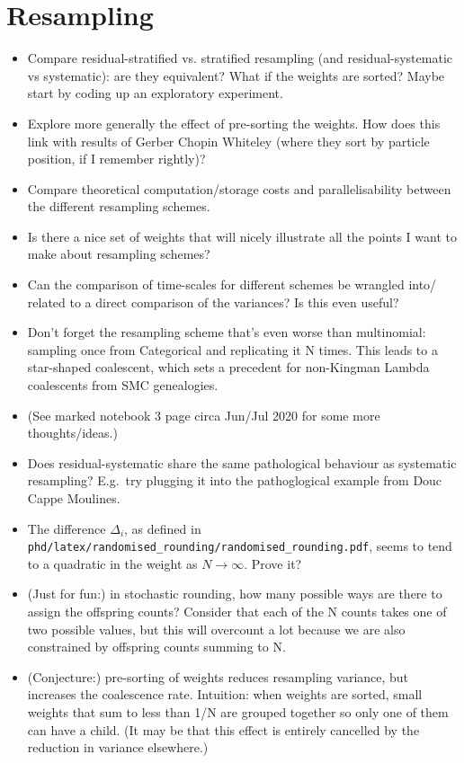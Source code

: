 \documentclass{article}
\begin{document}
\section*{Resampling}
\begin{itemize}
\item Compare residual-stratified vs. stratified resampling (and residual-systematic vs systematic): are they equivalent? What if the weights are sorted? Maybe start by coding up an exploratory experiment.
\item Explore more generally the effect of pre-sorting the weights. How does this link with results of Gerber Chopin Whiteley (where they sort by particle position, if I remember rightly)?
\item Compare theoretical computation/storage costs and parallelisability between the different resampling schemes.
\item Is there a nice set of weights that will nicely illustrate all the points I want to make about resampling schemes?
\item Can the comparison of time-scales for different schemes be wrangled into/ related to a direct comparison of the variances? Is this even useful?
\item Don't forget the resampling scheme that's even worse than multinomial: sampling once from Categorical and replicating it N times. This leads to a star-shaped coalescent, which sets a precedent for non-Kingman Lambda coalescents from SMC genealogies.
\item (See marked notebook 3 page circa Jun/Jul 2020 for some more thoughts/ideas.)
\item Does residual-systematic share the same pathological behaviour as systematic resampling? E.g.\ try plugging it into the pathoglogical example from Douc Cappe Moulines.
\item The difference $\Delta_i$, as defined in \texttt{phd/latex/randomised\_rounding/randomised\_rounding.pdf}, seems to tend to a quadratic in the weight as $N\to\infty$. Prove it?
\item (Just for fun:) in stochastic rounding, how many possible ways are there to assign the offspring counts? Consider that each of the N counts takes one of two possible values, but this will overcount a lot because we are also constrained by offspring counts summing to N.
\item (Conjecture:) pre-sorting of weights reduces resampling variance, but increases the coalescence rate. Intuition: when weights are sorted, small weights that sum to less than 1/N are grouped together so only one of them can have a child. (It may be that this effect is entirely cancelled by the reduction in variance elsewhere.)
\end{itemize}
\end{document}
